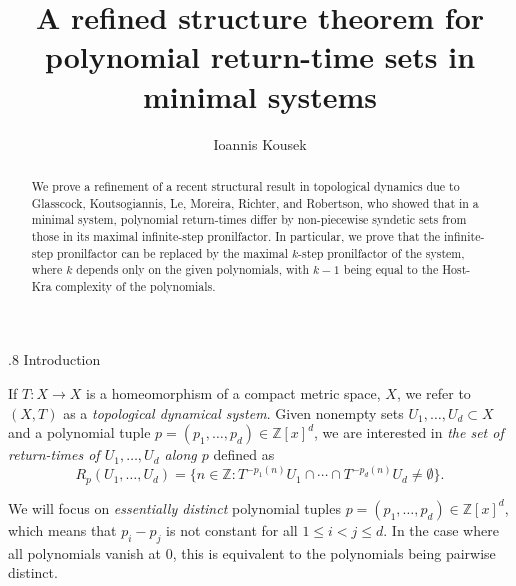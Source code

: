 \documentclass[reqno]{amsart}
\title{A refined structure theorem for polynomial return-time sets 
in minimal systems}
\author{Ioannis Kousek}
\date{}
\makeatletter
\def\Z{{\mathbb Z}}
\theoremstyle{definition}
\def\section{\@startsection{section}{1}%
  \z@{.5\linespacing\@plus.7\linespacing}
{.8\baselineskip}%
  {\normalfont\fontsize{11}{13}\centering\bfseries}%
}
\theoremstyle{remark}
\makeatother
\begin{document}
\begin{abstract}
\small{We prove a refinement of a recent structural result in 
topological dynamics due to 
Glasscock, Koutsogiannis, Le, Moreira, Richter, and 
Robertson, who 
showed that in a minimal system, polynomial return-times 
differ by non-piecewise syndetic sets from those in its 
maximal infinite-step pronilfactor. In particular, we prove 
that the infinite-step pronilfactor can be replaced by the
maximal $k$-step pronilfactor of the system, where $k$ 
depends only on the given polynomials, with $k-1$ being equal to 
the Host-Kra complexity of the polynomials.}
\end{abstract}

\maketitle

\section{Introduction}

If $T:X \to X$ is a homeomorphism of a compact metric space, $X$, 
we refer to $(X,T)$ as a \textit{topological dynamical system}. 
Given nonempty sets $U_1,\ldots,U_d\subset X$ and a polynomial 
tuple $p=(p_1,\ldots,p_d)\in \Z[x]^{d}$, we are interested in 
\textit{the set of return-times of $U_1,\ldots,U_d$ along $p$} 
defined as 
\begin{equation}\label{return time set eq}
R_p(U_1,\ldots,U_d)=\{n\in \Z: T^{-p_1(n)}U_1\cap \cdots \cap T^{-p_d(n)}U_d \neq \emptyset \}.    
\end{equation}


We will focus on 
\textit{essentially distinct} polynomial tuples 
$p=(p_1,\ldots,p_d)\in \Z[x]^d$, which 
means that $p_i-p_j$ is not constant for all $1 \leq i < j\leq d$. 
In the case where all polynomials vanish at $0$, this is 
equivalent to the polynomials being pairwise distinct. 
\end{document}
